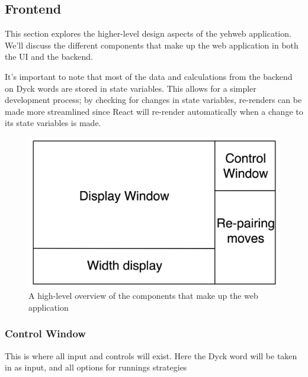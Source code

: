 \subsection{Frontend}
This section explores the higher-level design aspects of the yehweb application. We'll discuss the different components that make up the web application in both the UI and the backend.

It's important to note that most of the data and calculations from the backend on Dyck words are stored in state variables. This allows for a simpler development process; by checking for changes in state variables, re-renders can be made more streamlined since React will re-render automatically when a change to its state variables is made. 

\begin{figure}[H]
    \centering
    \includegraphics[scale=0.1]{./figures/webBreakdown.png}
    \caption{A high-level overview of the components that make up the web application}
\end{figure}

\subsubsection{Control Window}
This is where all input and controls will exist. Here the Dyck word will be taken in as input, and all options for runnings strategies
